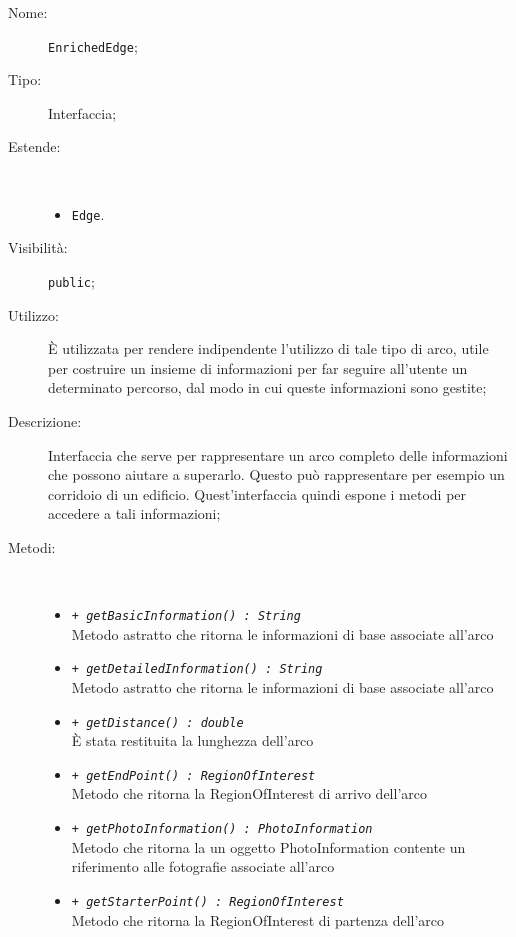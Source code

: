 \documentclass[../DefinizioneDiProdotto.tex]{subfiles}
\begin{document}
    \begin{description}
\item[Nome:] \texttt{EnrichedEdge};
\item[Tipo:] Interfaccia;
\item[Estende:] \
\begin{itemize}
\item \texttt{Edge}.

\end{itemize}
\item[Visibilità:] \texttt{public};
\item[Utilizzo:] È utilizzata per rendere indipendente l'utilizzo di tale tipo di arco, utile per costruire un insieme di informazioni per far seguire all'utente un determinato percorso, dal modo in cui queste informazioni sono gestite;
\item[Descrizione:] Interfaccia che serve per rappresentare un arco completo delle informazioni che possono aiutare a superarlo. Questo può rappresentare per esempio un corridoio di un edificio. Quest'interfaccia quindi espone i metodi per accedere a tali informazioni;
\item[Metodi:] \
\begin{itemize}
\item \texttt{+ \textit{getBasicInformation() : String}}\\
Metodo astratto che ritorna le informazioni di base associate all'arco
 \item \texttt{+ \textit{getDetailedInformation() : String}}\\
Metodo astratto che ritorna le informazioni di base associate all'arco
 \item \texttt{+ \textit{getDistance() : double}}\\
È stata restituita la lunghezza dell'arco 
 \item \texttt{+ \textit{getEndPoint() : RegionOfInterest}}\\
Metodo che ritorna la RegionOfInterest di arrivo dell'arco
 \item \texttt{+ \textit{getPhotoInformation() : PhotoInformation}}\\
Metodo che ritorna la un oggetto PhotoInformation contente un riferimento alle fotografie associate all'arco
 \item \texttt{+ \textit{getStarterPoint() : RegionOfInterest}}\\
Metodo che ritorna la RegionOfInterest di partenza dell'arco
 \end{itemize}
\end{description}
\end{document}
